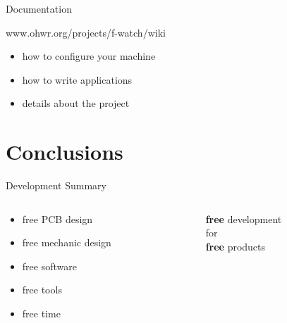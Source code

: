 \documentclass[compress,red]{beamer}
\begin{document}
\begin{frame}{Documentation}
  \Large
  \begin{center}
      www.ohwr.org/projects/f-watch/wiki
  \end{center}
  \vskip 1cm
  \begin{itemize}
  \item how to configure your machine
    \vskip 7mm
  \item how to write applications
    \vskip 7mm
  \item details about the project
  \end{itemize}

\end{frame}

\section{Conclusions}

\begin{frame}{Development Summary}
  \Large
  \begin{columns}[T] %
    \begin{column}{.55\textwidth}
      \begin{itemize}
      \item free PCB design
        \vskip 7mm
      \item free mechanic design
        \vskip 7mm
      \item free software
        \vskip 7mm
       \item free tools
         \vskip 7mm
       \item free time
      \end{itemize}
    \end{column}
    \hfill%
    \pause
    \begin{column}{.43\textwidth}
      \vskip 18mm
      \begin{center}
        \textbf{free} development \\
        for\\
        \textbf{free} products
      \end{center}
    \end{column}%
  \end{columns}
\end{frame}
\end{document}
